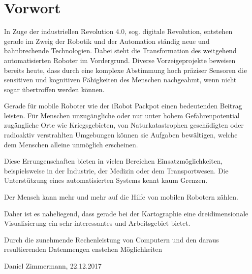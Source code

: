 \chapter*{Vorwort}


In Zuge der industriellen Revolution 4.0, sog. digitale Revolution, entstehen gerade im Zweig der Robotik und der Automation ständig neue und bahnbrechende Technologien. Dabei steht die Transformation des weitgehend automatisierten Roboter im Vordergrund. Diverse Vorzeigeprojekte beweisen bereits heute, dass durch eine komplexe Abstimmung hoch präziser Sensoren die sensitiven und kognitiven Fähigkeiten des Menschen nachgeahmt, wenn nicht sogar übertroffen werden können.

Gerade für mobile Roboter wie der iRobot Packpot einen bedeutenden Beitrag leisten. Für Menschen unzugängliche oder nur unter hohem Gefahrenpotential zugängliche Orte wie Kriegsgebieten, von Naturkatastrophen geschädigten oder radioaktiv verstrahlten Umgebungen können sie Aufgaben bewältigen, welche dem Menschen alleine unmöglich erscheinen.

Diese Errungenschaften bieten in vielen Bereichen Einsatzmöglichkeiten, beispielsweise in der Industrie, der Medizin oder dem Transportwesen. Die Unterstützung eines automatisierten Systems kennt kaum Grenzen. 

Der Mensch kann mehr und mehr auf die Hilfe von mobilen Robotern zählen.


Daher ist es naheliegend, dass gerade bei der Kartographie eine dreidimensionale Visualisierung ein sehr interessantes und  Arbeitsgebiet bietet. 

Durch die zunehmende Rechenleistung von Computern und den daraus resultierenden Datenmengen enstehen Möglichkeiten







 







Daniel Zimmermann, 22.12.2017